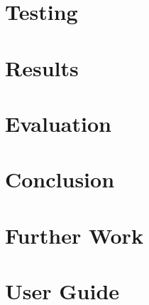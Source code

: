 \documentclass[12pt]{article}
\begin{document}
\section{Testing}
\section{Results}
\section{Evaluation}
\section{Conclusion}
\section{Further Work}
\section{User Guide}

\newpage
\appendix

% 


\end{document}

